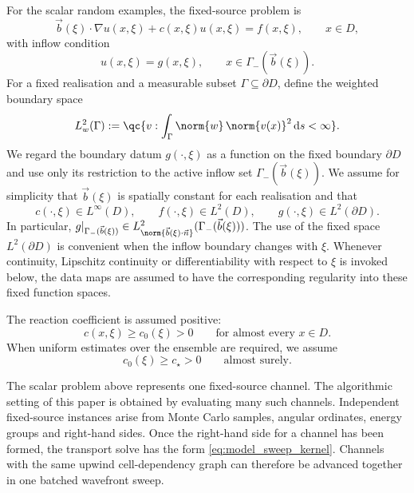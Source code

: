 \documentclass[final]{amsart}
\begin{document}
For the scalar random examples, the fixed-source problem is
\begin{equation}
  \vec b(\xi)\cdot\nabla u(x,\xi)
  +
  c(x,\xi)u(x,\xi)
  =
  f(x,\xi),
  \qquad
  x\in D,
  \label{eq:model_scalar_transport}
\end{equation}
with inflow condition
\begin{equation}
  u(x,\xi)=g(x,\xi),
  \qquad
  x\in\Gamma_-(\vec b(\xi)).
  \label{eq:model_scalar_inflow}
\end{equation}
For a fixed realisation and a measurable subset
$\Gamma\subseteq\partial D$, define the weighted boundary space
\begin{equation}
L^2_w(\Gamma)
:=
\qc{
v:
\int_{\Gamma}\norm{w}\,\norm{v(x)}^2\,\mathrm ds<\infty
}.
\label{eq:model_weighted_inflow_space}
\end{equation}
We regard the boundary datum $g(\cdot,\xi)$ as a function on the fixed
boundary $\partial D$ and use only its restriction to the active inflow
set $\Gamma_-(\vec b(\xi))$. We assume for simplicity that
$\vec b(\xi)$ is spatially constant for each realisation and that
\begin{equation}
c(\cdot,\xi)\in L^\infty(D),
\qquad
f(\cdot,\xi)\in L^2(D),
\qquad
g(\cdot,\xi)\in L^2(\partial D).
\label{eq:model_scalar_data}
\end{equation}
In particular,
$g|_{\Gamma_-(\vec b(\xi))}
\in
L^2_{\norm{\vec b(\xi)\cdot\vec n}}
(\Gamma_-(\vec b(\xi)))$.
The use of the fixed space $L^2(\partial D)$ is convenient when the
inflow boundary changes with $\xi$. Whenever continuity,
Lipschitz continuity or differentiability with respect to $\xi$ is
invoked below, the data maps are assumed to have the corresponding
regularity into these fixed function spaces.

The reaction coefficient is assumed positive:
\begin{equation}
  c(x,\xi)\geq c_0(\xi)>0
  \qquad
  \text{for almost every }x\in D.
  \label{eq:model_scalar_positivity}
\end{equation}
When uniform estimates over the ensemble are required, we assume
\begin{equation}
  c_0(\xi)\geq c_\star>0
  \qquad
  \text{almost surely}.
  \label{eq:model_uniform_positivity}
\end{equation}

The scalar problem above represents one fixed-source channel. The
algorithmic setting of this paper is obtained by evaluating many such
channels. Independent fixed-source instances arise from Monte Carlo
samples, angular ordinates, energy groups and right-hand sides. Once
the right-hand side for a channel has been formed, the transport solve
has the form \eqref{eq:model_sweep_kernel}. Channels with the same
upwind cell-dependency graph can therefore be advanced together in one
batched wavefront sweep.
\end{document}
